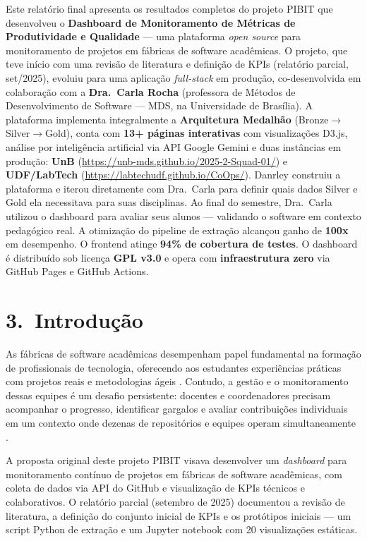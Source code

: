 \documentclass[
	12pt,
	openright,
	oneside,
	a4paper,
	brazil
]{abntex2}
\begin{document}
Este relatório final apresenta os resultados completos do projeto PIBIT que desenvolveu o \textbf{Dashboard de Monitoramento de Métricas de Produtividade e Qualidade} --- uma plataforma \textit{open source} para monitoramento de projetos em fábricas de software acadêmicas. O projeto, que teve início com uma revisão de literatura e definição de KPIs (relatório parcial, set/2025), evoluiu para uma aplicação \textit{full-stack} em produção, co-desenvolvida em colaboração com a \textbf{Dra.\ Carla Rocha} (professora de Métodos de Desenvolvimento de Software --- MDS, na Universidade de Brasília). A plataforma implementa integralmente a \textbf{Arquitetura Medalhão} (Bronze$\rightarrow$Silver$\rightarrow$Gold), conta com \textbf{13+ páginas interativas} com visualizações D3.js, análise por inteligência artificial via API Google Gemini e duas instâncias em produção: \textbf{UnB} (\url{https://unb-mds.github.io/2025-2-Squad-01/}) e \textbf{UDF/LabTech} (\url{https://labtechudf.github.io/CoOps/}). Danrley construiu a plataforma e iterou diretamente com Dra.\ Carla para definir quais dados Silver e Gold ela necessitava para suas disciplinas. Ao final do semestre, Dra.\ Carla utilizou o dashboard para avaliar seus alunos --- validando o software em contexto pedagógico real. A otimização do pipeline de extração alcançou ganho de \textbf{100x} em desempenho. O frontend atinge \textbf{94\% de cobertura de testes}. O dashboard é distribuído sob licença \textbf{GPL v3.0} e opera com \textbf{infraestrutura zero} via GitHub Pages e GitHub Actions.

\section*{3.\ Introdução}

As fábricas de software acadêmicas desempenham papel fundamental na formação de profissionais de tecnologia, oferecendo aos estudantes experiências práticas com projetos reais e metodologias ágeis \cite{dos2021experiencia,romanha2016modelo,fernandes2004fabrica}. Contudo, a gestão e o monitoramento dessas equipes é um desafio persistente: docentes e coordenadores precisam acompanhar o progresso, identificar gargalos e avaliar contribuições individuais em um contexto onde dezenas de repositórios e equipes operam simultaneamente \cite{hamer2021using,barbosaIndicadoresConjunto2016}.

A proposta original deste projeto PIBIT visava desenvolver um \textit{dashboard} para monitoramento contínuo de projetos em fábricas de software acadêmicas, com coleta de dados via API do GitHub e visualização de KPIs técnicos e colaborativos. O relatório parcial (setembro de 2025) documentou a revisão de literatura, a definição do conjunto inicial de KPIs e os protótipos iniciais --- um script Python de extração e um Jupyter notebook com 20 visualizações estáticas.
\end{document}
